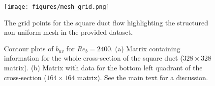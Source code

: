 \documentclass[11pt]{article}
\numberwithin{equation}{section}
\theoremstyle{plain}
\theoremstyle{definition}
\begin{document}
\begin{figure}[htbp!]
\centering
\texttt{[image: figures/mesh\_grid.png]}
\caption{The grid points for the square duct flow highlighting the structured non-uniform mesh in the provided dataset.}
\label{fig:duct_mesh}
\end{figure}
\begin{figure}[htbp!]
\centering
{}
\caption[Contour plots of $b_{uv}$ for $Re_{b}=2400$ from the dataset. (a) Matrix containing information for the whole cross-section of the square duct ($328\times328$ matrix). (b) Matrix with data for the bottom left quadrant of the cross-section ($164\times164$ matrix).]{Contour plots of $b_{uv}$ for $Re_{b}=2400$. (a) Matrix containing information for the whole cross-section of the square duct ($328\times328$ matrix). (b) Matrix with data for the bottom left quadrant of the cross-section ($164\times164$ matrix). See the main text for a discussion.}
\label{fig:boost_comparison}
\end{figure}
\end{document}
